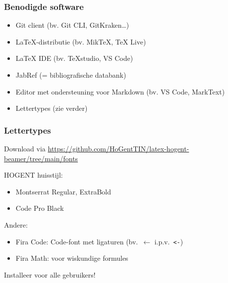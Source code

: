 \documentclass[aspectratio=169]{beamer}
\begin{document}
\begin{frame}
  \frametitle{Benodigde software}


  \begin{itemize}
    \item Git client (bv. Git CLI, GitKraken\ldots)
    \item \LaTeX-distributie (bv. MikTeX, TeX Live)
    \item {\LaTeX} IDE (bv. {\TeX}studio, VS Code)
    \item JabRef (= bibliografische databank)
    \item Editor met ondersteuning voor Markdown (bv. VS Code, MarkText)
    \item Lettertypes (zie verder)
  \end{itemize}

\end{frame}

\begin{frame}[fragile]
  \frametitle{Lettertypes}

  Download via \url{https://github.com/HoGentTIN/latex-hogent-beamer/tree/main/fonts}

  \bigskip

  HOGENT huisstijl:

  \begin{itemize}
    \item Montserrat Regular, ExtraBold
    \item Code Pro Black
  \end{itemize}

  Andere:

  \begin{itemize}
    \item Fira Code: Code-font met ligaturen (bv.\ \({\leftarrow}\) i.p.v.\ \verb|<-|)
    \item Fira Math: voor wiskundige formules
  \end{itemize}

  Installeer voor alle gebruikers!
\end{frame}
\end{document}
